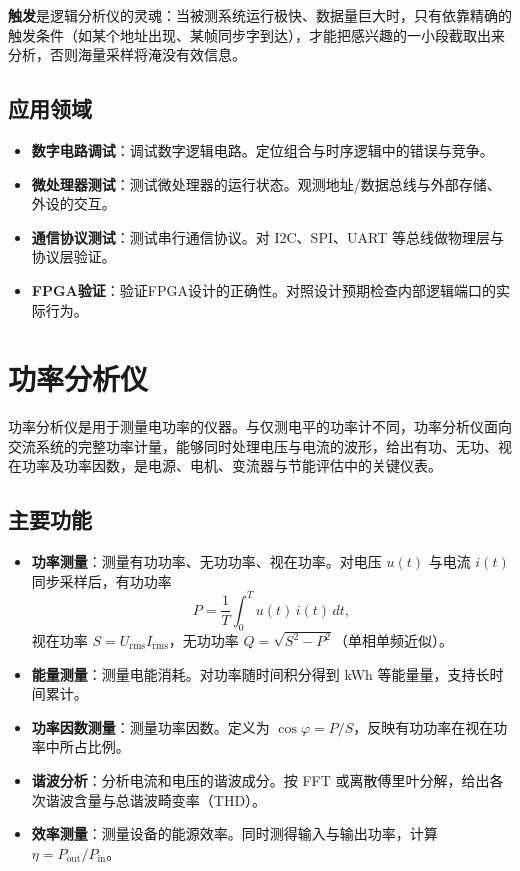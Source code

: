 \textbf{触发}是逻辑分析仪的灵魂：当被测系统运行极快、数据量巨大时，只有依靠精确的触发条件（如某个地址出现、某帧同步字到达），才能把感兴趣的一小段截取出来分析，否则海量采样将淹没有效信息。

\subsection{应用领域}

\begin{itemize}
    \item \textbf{数字电路调试}：调试数字逻辑电路。定位组合与时序逻辑中的错误与竞争。
    \item \textbf{微处理器测试}：测试微处理器的运行状态。观测地址/数据总线与外部存储、外设的交互。
    \item \textbf{通信协议测试}：测试串行通信协议。对 I2C、SPI、UART 等总线做物理层与协议层验证。
    \item \textbf{FPGA验证}：验证FPGA设计的正确性。对照设计预期检查内部逻辑端口的实际行为。
\end{itemize}

\section{功率分析仪}
\label{sec:power_analyzer}

功率分析仪是用于测量电功率的仪器。与仅测电平的功率计不同，功率分析仪面向交流系统的完整功率计量，能够同时处理电压与电流的波形，给出有功、无功、视在功率及功率因数，是电源、电机、变流器与节能评估中的关键仪表。

\subsection{主要功能}

\begin{itemize}
    \item \textbf{功率测量}：测量有功功率、无功功率、视在功率。对电压 $u(t)$ 与电流 $i(t)$ 同步采样后，有功功率
    \[
        P = \frac{1}{T}\int_0^T u(t)\,i(t)\,dt ,
    \]
    视在功率 $S = U_{\mathrm{rms}} I_{\mathrm{rms}}$，无功功率 $Q = \sqrt{S^2 - P^2}$（单相单频近似）。
    \item \textbf{能量测量}：测量电能消耗。对功率随时间积分得到 kWh 等能量量，支持长时间累计。
    \item \textbf{功率因数测量}：测量功率因数。定义为 $\cos\varphi = P/S$，反映有功功率在视在功率中所占比例。
    \item \textbf{谐波分析}：分析电流和电压的谐波成分。按 FFT 或离散傅里叶分解，给出各次谐波含量与总谐波畸变率（THD）。
    \item \textbf{效率测量}：测量设备的能源效率。同时测得输入与输出功率，计算 $\eta = P_{\mathrm{out}}/P_{\mathrm{in}}$。
\end{itemize}

